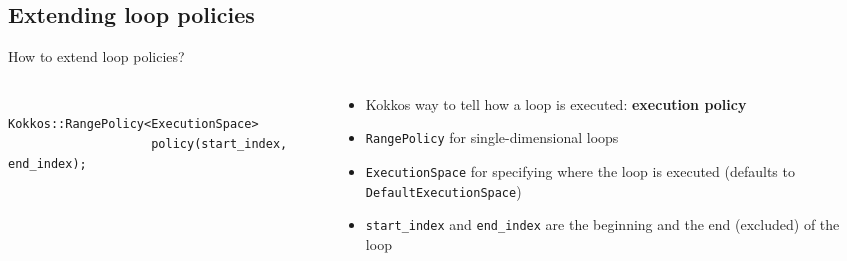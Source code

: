 \documentclass[aspectratio=169]{beamer}
\newcommand{\highlight}[1]{\textcolor{main}{\textbf{#1}}}
\begin{document}

\subsection{Extending loop policies}


\begin{frame}[fragile]{How to extend loop policies?}
    \begin{columns}
        \begin{column}{0.55\linewidth}
            \begin{verbatim}
                Kokkos::RangePolicy<ExecutionSpace>
                    policy(start_index, end_index);
            \end{verbatim}
        \end{column}
        \begin{column}{0.45\linewidth}
            \begin{itemize}
                \item Kokkos way to tell how a loop is executed: \highlight{execution policy}
                \item \texttt{RangePolicy} for single-dimensional loops
                \item \texttt{ExecutionSpace} for specifying where the loop is executed (defaults to \texttt{DefaultExecutionSpace})
                \item \texttt{start\_index} and \texttt{end\_index} are the beginning and the end (excluded) of the loop
            \end{itemize}
        \end{column}
    \end{columns}
\end{frame}

\end{document}
